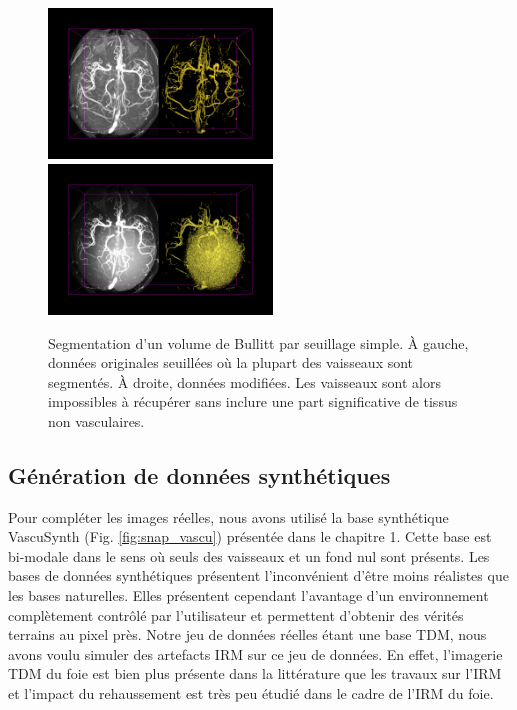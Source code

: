 \begin{figure}[!ht]
  \centering
  \includegraphics[height=4cm]{Images/threshold_bullitt.png}
  \includegraphics[height=4cm]{Images/threshold_bullitt_difficult.png}
  \caption{Segmentation d'un volume de Bullitt par seuillage simple. À gauche, données originales seuillées où la plupart des vaisseaux sont segmentés. À droite, données modifiées. Les vaisseaux sont alors impossibles à récupérer sans inclure une part significative de tissus non vasculaires.}
  \label{fig:modifications_bullitt}
\end{figure}

\subsection{Génération de données synthétiques}

Pour compléter les images réelles, nous avons utilisé la base synthétique VascuSynth (Fig. \ref{fig:snap_vascu}) présentée dans le chapitre 1. Cette base est bi-modale dans le sens où seuls des vaisseaux et un fond nul sont présents. Les bases de données synthétiques présentent l'inconvénient d'être moins réalistes que les bases naturelles. Elles présentent cependant l'avantage d'un environnement complètement contrôlé par l'utilisateur et permettent d'obtenir des vérités terrains au pixel près. Notre jeu de données réelles étant une base TDM, nous avons voulu simuler des artefacts IRM sur ce jeu de données. En effet, l'imagerie TDM du foie est bien plus présente dans la littérature que les travaux sur l'IRM et l'impact du rehaussement est très peu étudié dans le cadre de l'IRM du foie.

